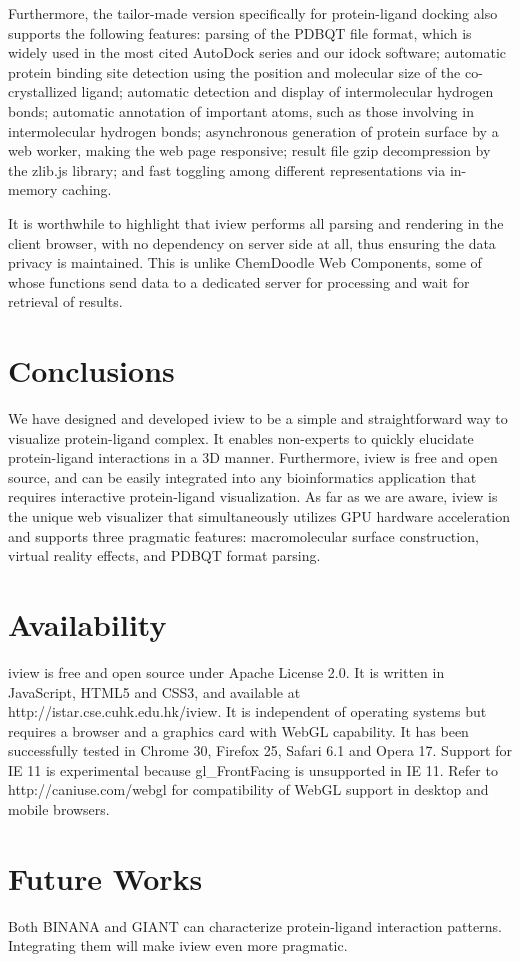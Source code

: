 Furthermore, the tailor-made version specifically for protein-ligand docking also supports the following features: parsing of the PDBQT file format, which is widely used in the most cited AutoDock series and our idock software; automatic protein binding site detection using the position and molecular size of the co-crystallized ligand; automatic detection and display of intermolecular hydrogen bonds; automatic annotation of important atoms, such as those involving in intermolecular hydrogen bonds; asynchronous generation of protein surface by a web worker, making the web page responsive; result file gzip decompression by the zlib.js library; and fast toggling among different representations via in-memory caching.

It is worthwhile to highlight that iview performs all parsing and rendering in the client browser, with no dependency on server side at all, thus ensuring the data privacy is maintained. This is unlike ChemDoodle Web Components, some of whose functions send data to a dedicated server for processing and wait for retrieval of results.

\section{Conclusions}

We have designed and developed iview to be a simple and straightforward way to visualize protein-ligand complex. It enables non-experts to quickly elucidate protein-ligand interactions in a 3D manner. Furthermore, iview is free and open source, and can be easily integrated into any bioinformatics application that requires interactive protein-ligand visualization. As far as we are aware, iview is the unique web visualizer that simultaneously utilizes GPU hardware acceleration and supports three pragmatic features: macromolecular surface construction, virtual reality effects, and PDBQT format parsing.

\section{Availability}

iview is free and open source under Apache License 2.0. It is written in JavaScript, HTML5 and CSS3, and available at http://istar.cse.cuhk.edu.hk/iview. It is independent of operating systems but requires a browser and a graphics card with WebGL capability. It has been successfully tested in Chrome 30, Firefox 25, Safari 6.1 and Opera 17. Support for IE 11 is experimental because gl\_FrontFacing is unsupported in IE 11. Refer to http://caniuse.com/webgl for compatibility of WebGL support in desktop and mobile browsers.

\section{Future Works}

Both BINANA \citep{1413} and GIANT \citep{1359} can characterize protein-ligand interaction patterns. Integrating them will make iview even more pragmatic.

\chapterend
